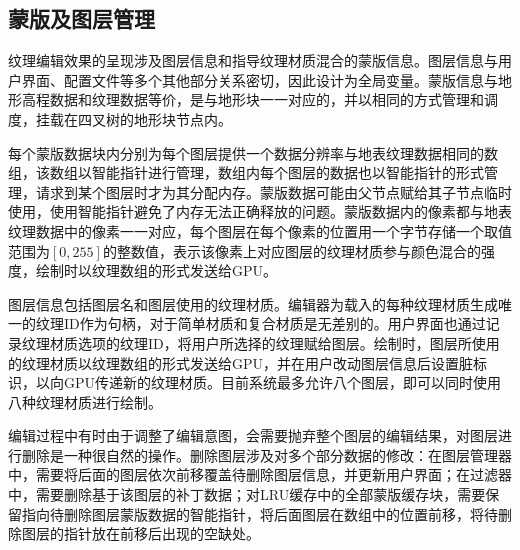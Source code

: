\subsection{蒙版及图层管理}
纹理编辑效果的呈现涉及图层信息和指导纹理材质混合的蒙版信息。图层信息与用户界面、配置文件等多个其他部分关系密切，因此设计为全局变量。蒙版信息与地形高程数据和纹理数据等价，是与地形块一一对应的，并以相同的方式管理和调度，挂载在四叉树的地形块节点内。\par
每个蒙版数据块内分别为每个图层提供一个数据分辨率与地表纹理数据相同的数组，该数组以智能指针进行管理，数组内每个图层的数据也以智能指针的形式管理，请求到某个图层时才为其分配内存。蒙版数据可能由父节点赋给其子节点临时使用，使用智能指针避免了内存无法正确释放的问题。蒙版数据内的像素都与地表纹理数据中的像素一一对应，每个图层在每个像素的位置用一个字节存储一个取值范围为$[0,255]$的整数值，表示该像素上对应图层的纹理材质参与颜色混合的强度，绘制时以纹理数组的形式发送给GPU。\par
图层信息包括图层名和图层使用的纹理材质。编辑器为载入的每种纹理材质生成唯一的纹理ID作为句柄，对于简单材质和复合材质是无差别的。用户界面也通过记录纹理材质选项的纹理ID，将用户所选择的纹理赋给图层。绘制时，图层所使用的纹理材质以纹理数组的形式发送给GPU，并在用户改动图层信息后设置脏标识，以向GPU传递新的纹理材质。目前系统最多允许八个图层，即可以同时使用八种纹理材质进行绘制。\par
编辑过程中有时由于调整了编辑意图，会需要抛弃整个图层的编辑结果，对图层进行删除是一种很自然的操作。删除图层涉及对多个部分数据的修改：在图层管理器中，需要将后面的图层依次前移覆盖待删除图层信息，并更新用户界面；在过滤器中，需要删除基于该图层的补丁数据；对LRU缓存中的全部蒙版缓存块，需要保留指向待删除图层蒙版数据的智能指针，将后面图层在数组中的位置前移，将待删除图层的指针放在前移后出现的空缺处。
